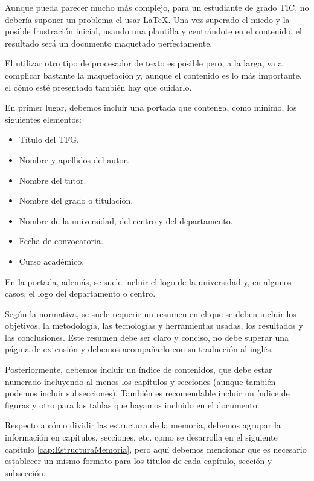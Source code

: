 Aunque pueda parecer mucho más complejo, para un estudiante de grado TIC, no debería suponer un problema el usar \LaTeX. Una vez superado el miedo y la posible frustración inicial, usando una plantilla y centrándote en el contenido, el resultado será un documento maquetado perfectamente.

El utilizar otro tipo de procesador de texto es posible pero, a la larga, va a complicar bastante la maquetación y, aunque el contenido es lo más importante, el cómo esté presentado también hay que cuidarlo.

En primer lugar, debemos incluir una portada que contenga, como mínimo, los siguientes elementos:
\begin{itemize}
    \item Título del TFG.
    \item Nombre y apellidos del autor.
    \item Nombre del tutor.
    \item Nombre del grado o titulación.
    \item Nombre de la universidad, del centro y del departamento.
    \item Fecha de convocatoria.
    \item Curso académico.
\end{itemize}

En la portada, además, se suele incluir el logo de la universidad y, en algunos casos, el logo del departamento o centro.


Según la normativa, se suele requerir un resumen en el que se deben incluir los objetivos, la metodología, las tecnologías y herramientas usadas, los resultados y las conclusiones. Este resumen debe ser claro y conciso, no debe superar una página de extensión y debemos acompañarlo con su traducción al inglés.

Posteriormente, debemos incluir un índice de contenidos, que debe estar numerado incluyendo al menos los capítulos y secciones (aunque también podemos incluir subsecciones). También es recomendable incluir un índice de figuras y otro para las tablas que hayamos incluido en el documento.

Respecto a cómo dividir las estructura de la memoria, debemos agrupar la información en capítulos, secciones, etc. como se desarrolla en el siguiente capítulo \ref{cap:EstructuraMemoria}, pero aquí debemos mencionar que es necesario establecer un mismo formato para los títulos de cada capítulo, sección y subsección.

